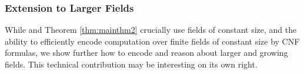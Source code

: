 \documentclass[11pt,letter]{article}
\theoremstyle{remark} %
\begin{document}
{%
%
%
%



\subsubsection{Extension to Larger Fields}

While \cite{ST25} and  Theorem \ref{thm:mainthm2} crucially use fields of constant size, and the ability to efficiently encode computation over finite fields of constant size by CNF formulas, we show further how to encode and reason about larger and growing fields. This technical contribution may be interesting on its own right. 

}
\end{document}
